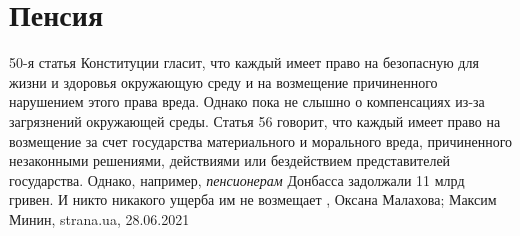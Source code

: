  
 
 
 
 
\chapter{Пенсия}

50-я статья Конституции гласит, что каждый имеет право на безопасную для жизни
и здоровья окружающую среду и на возмещение причиненного нарушением этого права
вреда.  Однако пока не слышно о компенсациях из-за загрязнений окружающей
среды.  Статья 56 говорит, что каждый имеет право на возмещение за счет
государства материального и морального вреда, причиненного незаконными
решениями, действиями или бездействием представителей государства.  Однако,
например, \emph{пенсионерам} Донбасса задолжали 11 млрд гривен. И никто
никакого ущерба им не возмещает
, 
Оксана Малахова; Максим Минин, strana.ua, 28.06.2021

